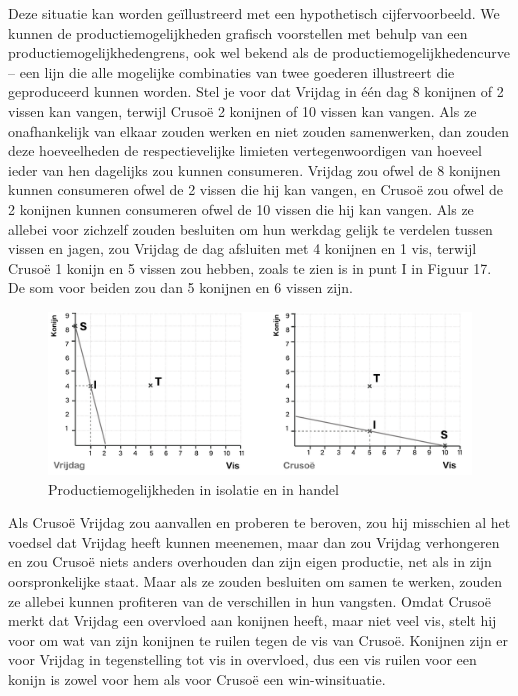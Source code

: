 Deze situatie kan worden geïllustreerd met een hypothetisch cijfervoorbeeld. We kunnen de productiemogelijkheden grafisch voorstellen met behulp van een productiemogelijkhedengrens, ook wel bekend als de productiemogelijkhedencurve -- een lijn die alle mogelijke combinaties van twee goederen illustreert die geproduceerd kunnen worden. Stel je voor dat Vrijdag in één dag 8 konijnen of 2 vissen kan vangen, terwijl Crusoë 2 konijnen of 10 vissen kan vangen. Als ze onafhankelijk van elkaar zouden werken en niet zouden samenwerken, dan zouden deze hoeveelheden de respectievelijke limieten vertegenwoordigen van hoeveel ieder van hen dagelijks zou kunnen consumeren. Vrijdag zou ofwel de 8 konijnen kunnen consumeren ofwel de 2 vissen die hij kan vangen, en Crusoë zou ofwel de 2 konijnen kunnen consumeren ofwel de 10 vissen die hij kan vangen. Als ze allebei voor zichzelf zouden besluiten om hun werkdag gelijk te verdelen tussen vissen en jagen, zou Vrijdag de dag afsluiten met 4 konijnen en 1 vis, terwijl Crusoë 1 konijn en 5 vissen zou hebben, zoals te zien is in punt I in Figuur 17. De som voor beiden zou dan 5 konijnen en 6 vissen zijn.

\begin{figure}[!htb]
\centering
    \includegraphics[width=\textwidth]{figures/fig17.pdf}
    \caption[Productiemogelijkheden in isolatie en in handel.]{Productiemogelijkheden in isolatie en in handel}
    \label{fig17}
\end{figure}

Als Crusoë Vrijdag zou aanvallen en proberen te beroven, zou hij misschien al het voedsel dat Vrijdag heeft kunnen meenemen, maar dan zou Vrijdag verhongeren en zou Crusoë niets anders overhouden dan zijn eigen productie, net als in zijn oorspronkelijke staat. Maar als ze zouden besluiten om samen te werken, zouden ze allebei kunnen profiteren van de verschillen in hun vangsten. Omdat Crusoë merkt dat Vrijdag een overvloed aan konijnen heeft, maar niet veel vis, stelt hij voor om wat van zijn konijnen te ruilen tegen de vis van Crusoë. Konijnen zijn er voor Vrijdag in tegenstelling tot vis in overvloed, dus een vis ruilen voor een konijn is zowel voor hem als voor Crusoë een win-winsituatie.

